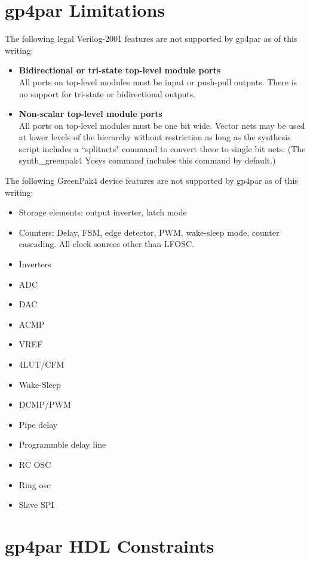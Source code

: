 \documentclass{article}
\begin{document}
\pagebreak
\section{gp4par Limitations}

The following legal Verilog-2001 features are not supported by gp4par as of this writing:

\begin{itemize}
\item {\bfseries Bidirectional or tri-state top-level module ports}\\All ports on top-level modules must be input or 
push-pull outputs. There is no support for tri-state or bidirectional outputs.
\item {\bfseries Non-scalar top-level module ports}\\All ports on top-level modules must be one bit wide. Vector nets 
may be used at lower levels of the hierarchy without restriction as long as the synthesis script includes a
``splitnets" command to convert these to single bit nets. (The synth\_greenpak4 Yosys command includes this command by 
default.)
\end{itemize}

The following GreenPak4 device features are not supported by gp4par as of this writing:

\begin{itemize}
\item Storage elements: output inverter, latch mode
\item Counters: Delay, FSM, edge detector, PWM, wake-sleep mode, counter cascading. All clock sources other than LFOSC.
\item Inverters
\item ADC
\item DAC
\item ACMP
\item VREF
\item 4LUT/CFM
\item Wake-Sleep
\item DCMP/PWM
\item Pipe delay
\item Programmble delay line
\item RC OSC
\item Ring osc
\item Slave SPI
\end{itemize}

\pagebreak
\section{gp4par HDL Constraints}
\end{document}
